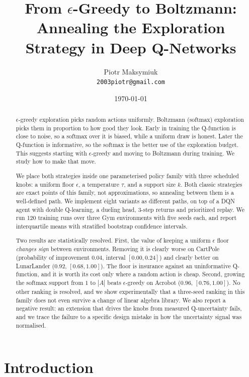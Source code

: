 \documentclass[11pt,a4paper]{article}
\title{\bfseries From $\epsilon$-Greedy to Boltzmann:\\
Annealing the Exploration Strategy in Deep Q-Networks}
\author{Piotr Maksymiuk\\
\small \texttt{2003piotr@gmail.com}}
\date{\today}
\begin{document}
\maketitle

\begin{abstract}
\noindent
$\epsilon$-greedy exploration picks random actions uniformly. Boltzmann
(softmax) exploration picks them in proportion to how good they look. Early in
training the Q-function is close to noise, so a softmax over it is biased,
while a uniform draw is honest. Later the Q-function is informative, so the
softmax is the better use of the exploration budget. This suggests starting
with $\epsilon$-greedy and moving to Boltzmann during training. We study how to
make that move.

We place both strategies inside one parameterised policy family with three
scheduled knobs: a uniform floor $\epsilon$, a temperature $\tau$, and a
support size $k$. Both classic strategies are exact points of this family, not
approximations, so annealing between them is a well-defined path. We implement
eight variants as different paths, on top of a DQN agent with double
Q-learning, a dueling head, 3-step returns and prioritized replay. We run 120
training runs over three Gym environments with five seeds each, and report
interquartile means with stratified bootstrap confidence intervals.

Two results are statistically resolved. First, the value of keeping a uniform
$\epsilon$ floor \emph{changes sign} between environments. Removing it is
clearly worse on CartPole (probability of improvement $0.04$, interval
$[0.00, 0.24]$) and clearly better on LunarLander ($0.92$, $[0.68, 1.00]$).
The floor is insurance against an uninformative Q-function, and it is worth
its cost only where a random action is cheap. Second, growing the softmax
support from $1$ to $|A|$ beats $\epsilon$-greedy on Acrobot ($0.96$,
$[0.76, 1.00]$). No other ranking is resolved, and we show experimentally that
a three-seed ranking in this family does not even survive a change of linear
algebra library. We also report a negative result: an extension that drives the
knobs from measured Q-uncertainty fails, and we trace the failure to a specific
design mistake in how the uncertainty signal was normalised.
\end{abstract}

\section{Introduction}
\label{sec:intro}
\end{document}
